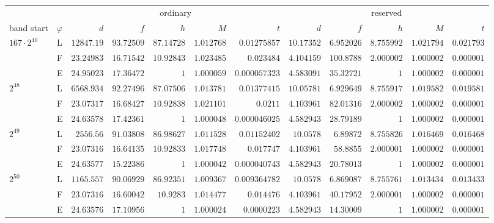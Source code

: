 \begin{center}\scriptsize\setlength{\tabcolsep}{2.5pt}
\begin{tabular}{@{}llrrrrrrrrrr@{}}
\toprule
 & & \multicolumn{5}{c}{ordinary} & \multicolumn{5}{c}{reserved}\\
\cmidrule(lr){3-7}\cmidrule(l){8-12}
band start & $\varphi$ & $d$ & $f$ & $h$ & $M$ & $t$ & $d$ & $f$ & $h$ & $M$ & $t$\\
\midrule
$167\cdot2^{40}$ & L & $12847.19$ & $93.72509$ & $87.14728$ & $1.012768$ & $0.01275857$ & $10.17352$ & $6.952026$ & $8.755992$ & $1.021794$ & $0.021793$\\
 & F & $23.24983$ & $16.71542$ & $10.92843$ & $1.023485$ & $0.023484$ & $4.104159$ & $100.8788$ & $2.000002$ & $1.000002$ & $0.000001$\\
 & E & $24.95023$ & $17.36472$ & $1$ & $1.000059$ & $0.000057323$ & $4.583091$ & $35.32721$ & $1$ & $1.000002$ & $0.000001$\\
\addlinespace[2pt]
$2^{48}$ & L & $6568.934$ & $92.27496$ & $87.07506$ & $1.013781$ & $0.01377415$ & $10.05781$ & $6.929649$ & $8.755917$ & $1.019582$ & $0.019581$\\
 & F & $23.07317$ & $16.68427$ & $10.92838$ & $1.021101$ & $0.0211$ & $4.103961$ & $82.01316$ & $2.000002$ & $1.000002$ & $0.000001$\\
 & E & $24.63578$ & $17.42361$ & $1$ & $1.000048$ & $0.000046025$ & $4.582943$ & $28.79189$ & $1$ & $1.000002$ & $0.000001$\\
\addlinespace[2pt]
$2^{49}$ & L & $2556.56$ & $91.03808$ & $86.98627$ & $1.011528$ & $0.01152402$ & $10.0578$ & $6.89872$ & $8.755826$ & $1.016469$ & $0.016468$\\
 & F & $23.07316$ & $16.64135$ & $10.92833$ & $1.017748$ & $0.017747$ & $4.103961$ & $58.8855$ & $2.000001$ & $1.000002$ & $0.000001$\\
 & E & $24.63577$ & $15.22386$ & $1$ & $1.000042$ & $0.000040743$ & $4.582943$ & $20.78013$ & $1$ & $1.000002$ & $0.000001$\\
\addlinespace[2pt]
$2^{50}$ & L & $1165.557$ & $90.06929$ & $86.92351$ & $1.009367$ & $0.009364782$ & $10.0578$ & $6.869087$ & $8.755761$ & $1.013434$ & $0.013433$\\
 & F & $23.07316$ & $16.60042$ & $10.9283$ & $1.014477$ & $0.014476$ & $4.103961$ & $40.17952$ & $2.000001$ & $1.000002$ & $0.000001$\\
 & E & $24.63576$ & $17.10956$ & $1$ & $1.000024$ & $0.0000223$ & $4.582943$ & $14.30009$ & $1$ & $1.000002$ & $0.000001$\\

\end{tabular}
\end{center}
